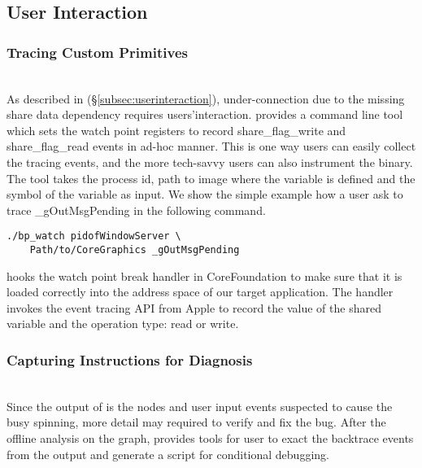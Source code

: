 
\subsection{User Interaction} 
\subsubsection{Tracing Custom Primitives} \label{subsec:tcp}\hfill\\

As described in (\S\ref{subsec:userinteraction}), under-connection due
to the missing share data dependency requires users'interaction. \xxx
provides a command line tool which sets the watch point registers to record
share\_flag\_write and share\_flag\_read events in ad-hoc manner. This is one
way users can easily collect the tracing events, and the more tech-savvy users
can also instrument the binary. The tool takes the process id, path to image
where the variable is defined and the symbol of the variable as input. We
show the simple example how a user ask \xxx to trace \_gOutMsgPending in the
following command.

\begin{BVerbatim}
./bp_watch pidofWindowServer \
	Path/to/CoreGraphics _gOutMsgPending
\end{BVerbatim}

\xxx hooks the watch point break handler in CoreFoundation to make sure that it is
loaded correctly into the address space of our target application. The handler
invokes the event tracing API from Apple to record the value of the shared
variable and the operation type: read or write.
\\
\subsubsection{Capturing Instructions for Diagnosis}\hfill\\
Since the output of \xxx is the nodes and user input events suspected to cause
the busy spinning, more detail may required to verify and fix the bug. After
the offline analysis on the graph, \xxx provides tools for user to exact
the backtrace events from the output and generate a script for conditional
debugging.

